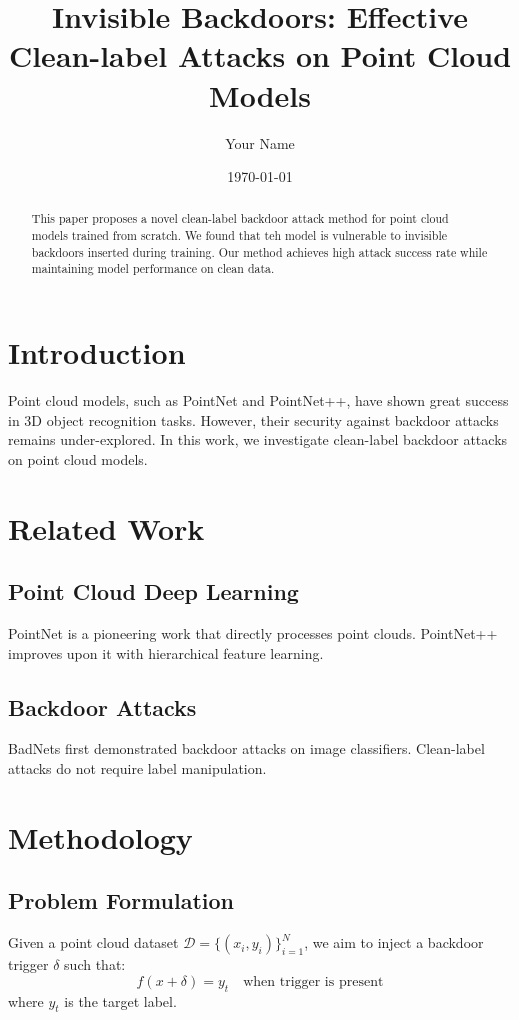 \documentclass{article}
\title{Invisible Backdoors: Effective Clean-label Attacks on Point Cloud Models}
\author{Your Name}
\date{\today}
\begin{document}
\maketitle

\begin{abstract}
This paper proposes a novel clean-label backdoor attack method for point cloud models trained from scratch. We found that teh model is vulnerable to invisible backdoors inserted during training. Our method achieves high attack success rate while maintaining model performance on clean data.
\end{abstract}

\section{Introduction}
Point cloud models, such as PointNet and PointNet++, have shown great success in 3D object recognition tasks. However, their security against backdoor attacks remains under-explored. In this work, we investigate clean-label backdoor attacks on point cloud models.

\section{Related Work}
\subsection{Point Cloud Deep Learning}
PointNet \cite{qi2017pointnet} is a pioneering work that directly processes point clouds. PointNet++ \cite{qi2017pointnet++} improves upon it with hierarchical feature learning.

\subsection{Backdoor Attacks}
BadNets \cite{gu2017badnets} first demonstrated backdoor attacks on image classifiers. Clean-label attacks \cite{turner2019clean} do not require label manipulation.

\section{Methodology}
\subsection{Problem Formulation}
Given a point cloud dataset $\mathcal{D} = \{(x_i, y_i)\}_{i=1}^N$, we aim to inject a backdoor trigger $\delta$ such that:
\begin{equation}
f(x + \delta) = y_t \quad \text{when trigger is present}
\end{equation}
where $y_t$ is the target label.
\end{document}
